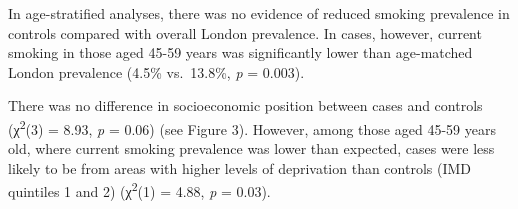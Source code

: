 \documentclass[
]{article}
\newenvironment{Shaded}{\begin{snugshade}}{\end{snugshade}}
\newcommand{\DataTypeTok}[1]{\textcolor[rgb]{0.13,0.29,0.53}{#1}}
\newcommand{\DecValTok}[1]{\textcolor[rgb]{0.00,0.00,0.81}{#1}}
\newcommand{\KeywordTok}[1]{\textcolor[rgb]{0.13,0.29,0.53}{\textbf{#1}}}
\newcommand{\NormalTok}[1]{#1}
\newcommand{\OperatorTok}[1]{\textcolor[rgb]{0.81,0.36,0.00}{\textbf{#1}}}
\newcommand{\StringTok}[1]{\textcolor[rgb]{0.31,0.60,0.02}{#1}}
\begin{document}
\begin{Shaded}
\end{Shaded}

In age-stratified analyses, there was no evidence of reduced smoking
prevalence in controls compared with overall London prevalence. In
cases, however, current smoking in those aged 45-59 years was
significantly lower than age-matched London prevalence (4.5\%
vs.~13.8\%, \emph{p} = 0.003).

There was no difference in socioeconomic position between cases and
controls (χ\textsuperscript{2}(3) = 8.93, \emph{p} = 0.06) (see Figure
3). However, among those aged 45-59 years old, where current smoking
prevalence was lower than expected, cases were less likely to be from
areas with higher levels of deprivation than controls (IMD quintiles 1
and 2) (χ\textsuperscript{2}(1) = 4.88, \emph{p} = 0.03).
\end{document}
